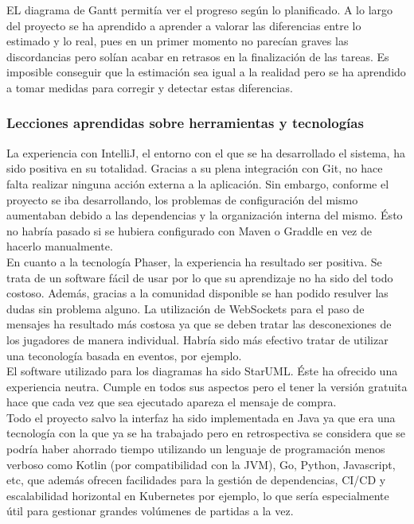 EL diagrama de Gantt permitía ver el progreso según lo planificado. A lo largo del proyecto se ha aprendido a aprender a valorar las diferencias entre lo estimado y lo real, pues en un primer momento no parecían graves las discordancias pero solían acabar en retrasos en la finalización de las tareas. Es imposible conseguir que la estimación sea igual a la realidad pero se ha aprendido a tomar medidas para corregir y detectar estas diferencias.

\subsubsection{Lecciones aprendidas sobre herramientas y tecnologías}
La experiencia con IntelliJ, el entorno con el que se ha desarrollado el sistema, ha sido positiva en su totalidad. Gracias a su plena integración con Git, no hace falta realizar ninguna acción externa a la aplicación. Sin embargo, conforme el proyecto se iba desarrollando, los problemas de configuración del mismo aumentaban debido a las dependencias y la organización interna del mismo. Ésto no habría pasado si se hubiera configurado con Maven o Graddle en vez de hacerlo manualmente.
\\
En cuanto a la tecnología Phaser, la experiencia ha resultado ser positiva. Se trata de un software fácil de usar por lo que su aprendizaje no ha sido del todo costoso. Además, gracias a la comunidad disponible se han podido resulver las dudas sin problema alguno. La utilización de WebSockets para el paso de mensajes ha resultado más costosa ya que se deben tratar las desconexiones de los jugadores de manera individual. Habría sido más efectivo tratar de utilizar una teconología basada en eventos, por ejemplo.
\\
El software utilizado para los diagramas ha sido StarUML. Éste ha ofrecido una experiencia neutra. Cumple en todos sus aspectos pero el tener la versión gratuita hace que cada vez que sea ejecutado apareza el mensaje de compra.
\\
Todo el proyecto salvo la interfaz ha sido implementada en Java ya que era una tecnología con la que ya se ha trabajado pero en retrospectiva se considera que se podría haber ahorrado tiempo utilizando un lenguaje de programación menos verboso como Kotlin (por compatibilidad con la JVM), Go, Python, Javascript, etc, que además ofrecen facilidades para la gestión de dependencias, CI/CD y escalabilidad horizontal en Kubernetes por ejemplo, lo que sería especialmente útil para gestionar grandes volúmenes de partidas a la vez.
